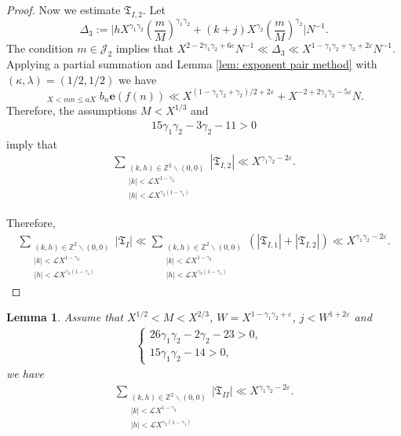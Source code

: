 \documentclass[12pt, reqno, twoside, letterpaper]{amsart}
\numberwithin{equation}{section}
\newcommand{\cL}{\ensuremath{\mathcal{L}}}
\newcommand{\ZZ}{\ensuremath{\mathbb{Z}}}
\theoremstyle{customthm}
\newtheorem{lemma}[X]{Lemma}
\theoremstyle{customrem}
\begin{document}
\begin{proof}
	Now we estimate $\mathfrak{T}_{I,2}$. Let
	$$
	\Delta_3:=\bigg|hX^{\gamma_1\gamma_2}\left(\frac{m}{M}\right)^{\gamma_1\gamma_2}
	+(k+j)X^{\gamma_2}\left(\frac{m}{M}\right)^{\gamma_2}\bigg|N^{-1}.
	$$
	The condition $m\in\mathcal{J}_2$ implies that
    $X^{2-2\gamma_1\gamma_2+6\varepsilon} N^{-1}\ll \Delta_3\ll
	X^{1-\gamma_1\gamma_2+\gamma_2+2\varepsilon} N^{-1}$.
	Applying a partial summation and Lemma \ref{lem: exponent pair method} with $(\kappa,\lambda)=(1/2,1/2)$
	we have
	$$
	\mathop{\sum_{n\sim N}}_{X < mn \leqslant aX}b_n\mathbf{e}(f(n))
	\ll X^{(1-\gamma_1\gamma_2+\gamma_2)/2+2\varepsilon}+X^{-2+2\gamma_1\gamma_2-5\varepsilon} N.
	$$
	Therefore, the assumptions $M<X^{1/3}$ and
	\begin{align*}
		15\gamma_1\gamma_2-3\gamma_2-11>0
	\end{align*}
	imply that
	\begin{align*}
		\sum_{\substack{(k,h) \in \ZZ^2 \backslash (0,0) \\ |k|<\cL X^{1-\gamma_2} \\ |h|<\cL X^{\gamma_2(1-\gamma_1)}}}|\mathfrak{T}_{I,2}|
		\ll X^{\gamma_1\gamma_2-2\varepsilon}.
	\end{align*}

	Therefore,
	\begin{align*}
		\sum_{\substack{(k,h) \in \ZZ^2 \backslash (0,0) \\ |k|<\cL X^{1-\gamma_2} \\ |h|<\cL X^{\gamma_2(1-\gamma_1)}}}
		|\mathfrak{T}_{I}|\ll
\sum_{\substack{(k,h) \in \ZZ^2 \backslash (0,0) \\ |k|<\cL X^{1-\gamma_2} \\ |h|<\cL X^{\gamma_2(1-\gamma_1)}}}
		(|\mathfrak{T}_{I,1}|+|\mathfrak{T}_{I,2}|)\ll
X^{\gamma_1\gamma_2-2\varepsilon}.
	\end{align*}
\end{proof}


\begin{lemma}\label{lemma: Gamma II} Assume that $X^{1/2}<M<X^{2/3}$, $W=X^{1-\gamma_1\gamma_2+\varepsilon}$, $j<W^{1+2\varepsilon}$ and
	\begin{align}\label{eq: condition 3}
		\left\{\begin{array}{ll} 26\gamma_1\gamma_2-2\gamma_2-23>0, & \\
			15\gamma_1\gamma_2-14>0,
		\end{array}\right.
	\end{align}
	we have
	\begin{align*}
		\sum_{\substack{(k,h) \in \ZZ^2 \backslash (0,0) \\ |k|<\cL X^{1-\gamma_2} \\ |h|<\cL X^{\gamma_2(1-\gamma_1)}}}|\mathfrak{T}_{II}|\ll X^{\gamma_1\gamma_2-2\varepsilon}.
	\end{align*}
\end{lemma}
\end{document}
